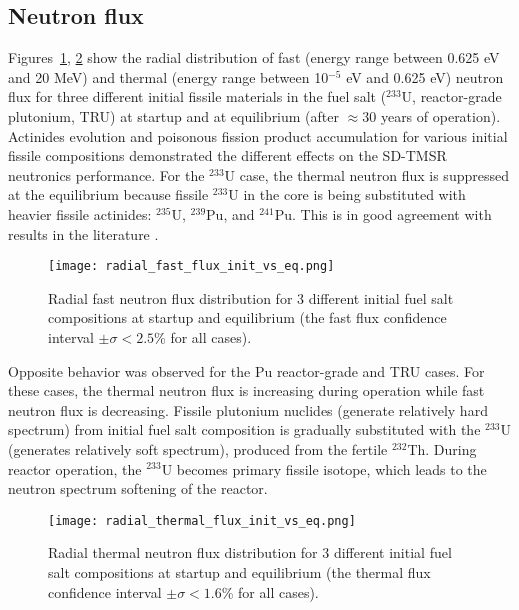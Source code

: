 \subsection{Neutron flux}
Figures~\ref{fig:fast_flux}, \ref{fig:thermal_flux} show the radial 
distribution of fast (energy range between 0.625 eV and 20 MeV) and thermal 
(energy range between 10$^{-5}$ eV and 0.625 eV) neutron flux for three 
different initial fissile materials in the fuel salt ($^{233}$U, reactor-grade 
plutonium, TRU) at startup and at equilibrium (after $\approx 30$ years of 
operation). Actinides evolution and poisonous fission product accumulation 
for various initial fissile compositions demonstrated the different effects on 
the SD-TMSR neutronics performance. For the $^{233}$U case, the thermal neutron 
flux is suppressed at the equilibrium because fissile $^{233}$U in the core is 
being substituted with heavier fissile actinides: $^{235}$U, $^{239}$Pu, and 
$^{241}$Pu. This is in good agreement with results in the literature 
\cite{rykhlevskii2019modeling, ashraf2019whole_core}.
\begin{figure}[htp!] %
	\texttt{[image: radial\_fast\_flux\_init\_vs\_eq.png]} 
	\caption{Radial fast neutron flux distribution for 3 different initial 
		fuel salt compositions at startup and equilibrium (the fast flux 
		confidence interval $\pm\sigma<2.5$\% for all cases).}
	\label{fig:fast_flux}
\end{figure}

Opposite behavior was observed for the Pu reactor-grade and TRU cases. For 
these cases, the thermal neutron flux is increasing during operation while 
fast neutron flux is decreasing. Fissile plutonium nuclides (generate 
relatively hard spectrum) from initial fuel salt composition is gradually 
substituted with the $^{233}$U (generates relatively soft spectrum), produced 
from the fertile $^{232}$Th. During reactor operation, the $^{233}$U becomes 
primary fissile isotope, which leads to the neutron spectrum softening of the 
reactor. 
\begin{figure}[htp!] %
	\texttt{[image: radial\_thermal\_flux\_init\_vs\_eq.png]} 
	\caption{Radial thermal neutron flux distribution for 3 different initial 
		fuel salt compositions at startup and equilibrium (the thermal flux 
		confidence interval $\pm\sigma<1.6$\% for all cases).}
	\label{fig:thermal_flux}
\end{figure}

